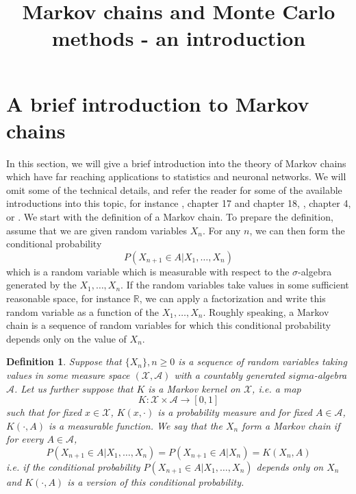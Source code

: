 \documentclass[a4paper, draft]{article}
\title{Markov chains and Monte Carlo methods - an introduction}
\theoremstyle{own}
\newtheorem{defn}{Definition}[section]
\theoremstyle{remark}
\newcommand{\R}{\mathbb{R}}
\begin{document}
\maketitle

\tableofcontents




\section{A brief introduction to Markov chains}

In this section, we will give a brief introduction into the theory of Markov chains which have far reaching applications to statistics and neuronal networks. We will omit some of the technical details, and refer the reader for some of the available introductions into this topic, for instance \cite{Klenke}, chapter 17 and chapter 18, \cite{RobertCasella1999}, chapter 4, or \cite{MeynTweedie}. We start with the definition of a Markov chain. To prepare the definition, assume that we are given random variables $X_n$. For any $n$, we can then form the conditional probability
$$
P(X_{n+1} \in A | X_1, \dots, X_n)
$$
which is a random variable which is measurable with respect to the $\sigma$-algebra generated by the $X_1, \dots, X_n$. If the random variables take values in some sufficient reasonable space, for instance $\R$, we can apply a factorization and write this random variable as a function of the $X_1, \dots, X_n$. Roughly speaking, a Markov chain is a sequence of random variables for which this conditional probability depends only on the value of $X_n$.  

\begin{defn}\label{defn:markovchain}
Suppose that $\{X_n\}, n \geq 0$ is a sequence of random variables taking values in some measure space $({\mathcal X}, {\mathcal A})$ with a countably generated $sigma$-algebra ${\mathcal A}$. Let us further suppose that $K$ is a {\em Markov kernel} on $\mathcal X$, i.e. a map
$$
K \colon {\mathcal X} \times {\mathcal A} \rightarrow [0,1]
$$
such that for fixed $x \in {\mathcal X}$, $K(x,\cdot)$ is a probability measure and for fixed $A \in {\mathcal A}$, $K(\cdot, A)$ is a measurable function. 
 We say that the $X_n$ form a {\em  Markov chain} if for every $A \in {\mathcal A}$,
 $$
 P(X_{n+1} \in A | X_1, \dots, X_n) = P(X_{n+1} \in A | X_n) = K(X_n,A)
 $$
 i.e. if the conditional probability  $P(X_{n+1} \in A | X_1, \dots, X_n)$ depends only on $X_n$ and $K(\cdot, A)$ is a version of this conditional probability.
\end{defn}
\end{document}
